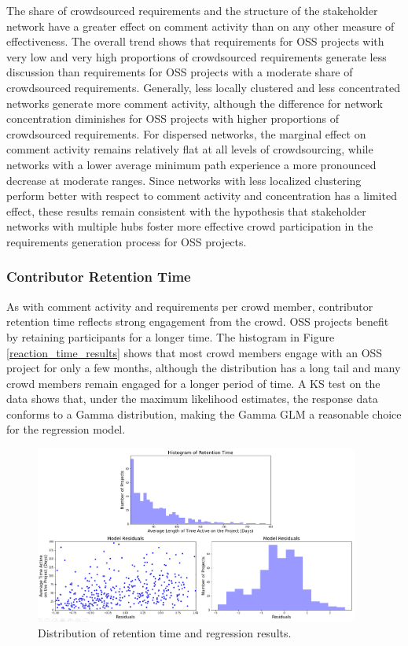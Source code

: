 The share of crowdsourced requirements and the structure of the stakeholder network have a greater effect on comment activity than on any other measure of effectiveness. The overall trend shows that requirements for OSS projects with very low and very high proportions of crowdsourced requirements generate less discussion than requirements for OSS projects with a moderate share of crowdsourced requirements. Generally, less locally clustered and less concentrated networks generate more comment activity, although the difference for network concentration diminishes for OSS projects with higher proportions of crowdsourced requirements. For dispersed networks, the marginal effect on comment activity remains relatively flat at all levels of crowdsourcing, while networks with a lower average minimum path experience a more pronounced decrease at moderate ranges. Since networks with less localized clustering perform better with respect to comment activity and concentration has a limited effect, these results remain consistent with the hypothesis that stakeholder networks with multiple hubs foster more effective crowd participation in the requirements generation process for OSS projects.

\subsubsection{Contributor Retention Time}

As with comment activity and requirements per crowd member, contributor retention time reflects strong engagement from the crowd. OSS projects benefit by retaining participants for a longer time. The histogram in Figure \ref{reaction_time_results} shows that most crowd members engage with an OSS project for only a few months, although the distribution has a long tail and many crowd members remain engaged for a longer period of time. A KS test on the data shows that, under the maximum likelihood estimates, the response data conforms to a Gamma distribution, making the Gamma GLM a reasonable choice for the regression model. 

\begin{figure}
  \includegraphics[width=0.95\textwidth]{retention_time_results.PNG}
\caption{Distribution of retention time and regression results.}
\label{retention_time_results}
\end{figure}

